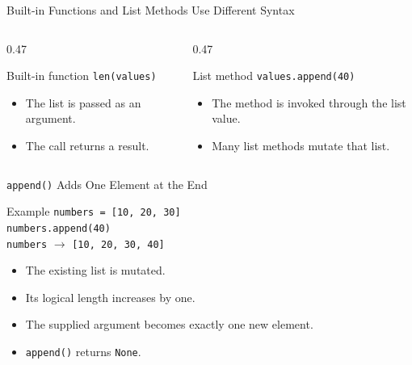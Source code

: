 \documentclass[aspectratio=169,10pt]{beamer}
\begin{document}
\begin{frame}{Built-in Functions and List Methods Use Different Syntax}
  \begin{columns}[T,onlytextwidth]
    \begin{column}{0.47\textwidth}
      \begin{block}{Built-in function}
        \centering
        \Large\texttt{len(values)}
      \end{block}
      \begin{itemize}
        \item The list is passed as an argument.
        \item The call returns a result.
      \end{itemize}
    \end{column}
    \begin{column}{0.47\textwidth}
      \begin{block}{List method}
        \centering
        \Large\texttt{values.append(40)}
      \end{block}
      \begin{itemize}
        \item The method is invoked through the list value.
        \item Many list methods mutate that list.
      \end{itemize}
    \end{column}
  \end{columns}
\end{frame}




\begin{frame}{\texttt{append()} Adds One Element at the End}
  \begin{block}{Example}
    \texttt{numbers = [10, 20, 30]}\\
    \texttt{numbers.append(40)}\\[0.08in]
    \texttt{numbers} $\longrightarrow$ \texttt{[10, 20, 30, 40]}
  \end{block}

  \begin{itemize}
    \item The existing list is mutated.
    \item Its logical length increases by one.
    \item The supplied argument becomes exactly one new element.
    \item \texttt{append()} returns \texttt{None}.
  \end{itemize}
\end{frame}
\end{document}
